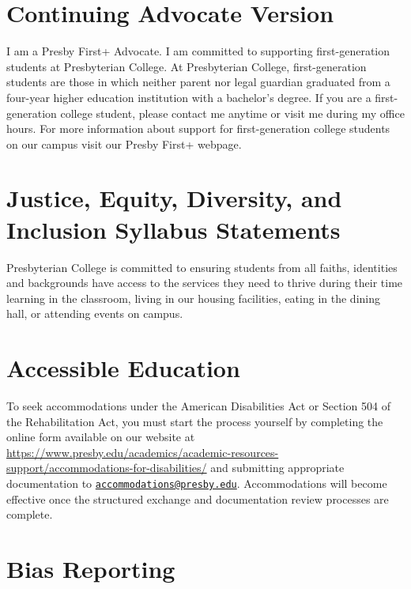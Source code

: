\documentclass[
]{book}
\begin{document}
\hypertarget{continuing-advocate-version}{%
\section{Continuing Advocate Version}\label{continuing-advocate-version}}

I am a Presby First+ Advocate. I am committed to supporting first-generation students at Presbyterian College. At Presbyterian College, first-generation students are those in which neither parent nor legal guardian graduated from a four-year higher education institution with a bachelor's degree. If you are a first-generation college student, please contact me anytime or visit me during my office hours. For more information about support for first-generation college students on our campus visit our Presby First+ webpage.

\hypertarget{justice-equity-diversity-and-inclusion-syllabus-statements}{%
\section{Justice, Equity, Diversity, and Inclusion Syllabus Statements}\label{justice-equity-diversity-and-inclusion-syllabus-statements}}

Presbyterian College is committed to ensuring students from all faiths, identities and backgrounds have access to the services they need to thrive during their time learning in the classroom, living in our housing facilities, eating in the dining hall, or attending events on campus.

\hypertarget{accessible-education}{%
\section{Accessible Education}\label{accessible-education}}

To seek accommodations under the American Disabilities Act or Section 504 of the Rehabilitation Act, you must start the process yourself by completing the online form available on our website at \url{https://www.presby.edu/academics/academic-resources-support/accommodations-for-disabilities/} and submitting appropriate documentation to \href{mailto:accommodations@presby.edu}{\nolinkurl{accommodations@presby.edu}}. Accommodations will become effective once the structured exchange and documentation review processes are complete.

\hypertarget{bias-reporting}{%
\section{Bias Reporting}\label{bias-reporting}}
\end{document}
